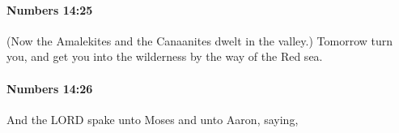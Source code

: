 		\paragraph{Numbers 14:25} %
			\label{NUMBERS-14-25}

			(Now the Amalekites and the Canaanites dwelt in the valley.) Tomorrow turn you, and get you into the wilderness by the way of the Red sea.


		\paragraph{Numbers 14:26} %
			\label{NUMBERS-14-26}

			And the LORD spake unto Moses and unto Aaron, saying,


